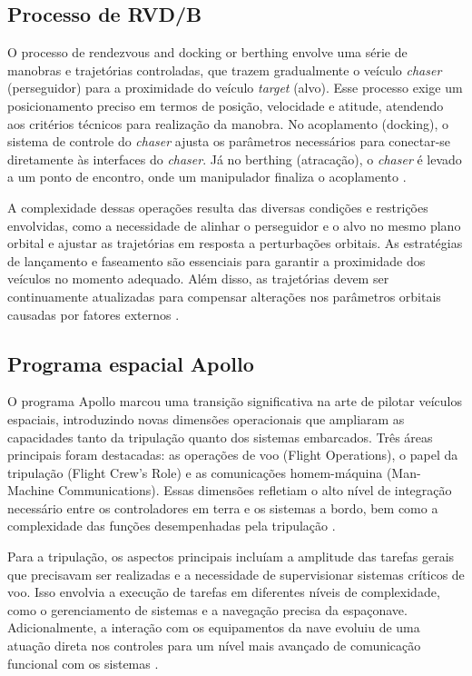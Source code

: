 \subsection{Processo de RVD/B}

O processo de rendezvous and docking or berthing envolve uma série de manobras e trajetórias controladas, que trazem gradualmente o veículo \textit{chaser} (perseguidor) para a proximidade do veículo \textit{target} (alvo). Esse processo exige um posicionamento preciso em termos de posição, velocidade e atitude, atendendo aos critérios técnicos para realização da manobra.
No acoplamento (docking), o sistema de controle do \textit{chaser} ajusta os parâmetros necessários para conectar-se diretamente às interfaces do \textit{chaser}.
Já no berthing (atracação), o \textit{chaser} é levado a um ponto de encontro, onde um manipulador finaliza o acoplamento \cite{fehse2003}.

A complexidade dessas operações resulta das diversas condições e restrições envolvidas, como a necessidade de alinhar o perseguidor e o alvo no mesmo plano orbital e ajustar as trajetórias em resposta a perturbações orbitais.
As estratégias de lançamento e faseamento são essenciais para garantir a proximidade dos veículos no momento adequado. Além disso, as trajetórias devem ser continuamente atualizadas para compensar alterações nos parâmetros orbitais causadas por fatores externos \cite{fehse2003}.

\subsection{Programa espacial Apollo}

O programa Apollo marcou uma transição significativa na arte de pilotar veículos espaciais, introduzindo novas dimensões operacionais que ampliaram as capacidades tanto da tripulação quanto dos sistemas embarcados. Três áreas principais foram destacadas: as operações de voo (Flight Operations), o papel da tripulação (Flight Crew's Role) e as comunicações homem-máquina (Man-Machine Communications). Essas dimensões refletiam o alto nível de integração necessário entre os controladores em terra e os sistemas a bordo, bem como a complexidade das funções desempenhadas pela tripulação \cite{nevins1971}.

Para a tripulação, os aspectos principais incluíam a amplitude das tarefas gerais que precisavam ser realizadas e a necessidade de supervisionar sistemas críticos de voo. Isso envolvia a execução de tarefas em diferentes níveis de complexidade, como o gerenciamento de sistemas e a navegação precisa da espaçonave. Adicionalmente, a interação com os equipamentos da nave evoluiu de uma atuação direta nos controles para um nível mais avançado de comunicação funcional com os sistemas \cite{nevins1971}.


